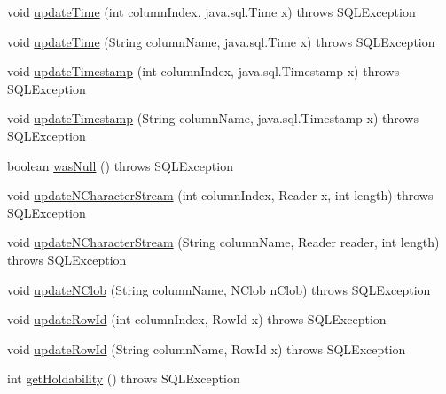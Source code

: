 \begin{DoxyCompactItemize}
\item 
void \mbox{\hyperlink{classcom_1_1mysql_1_1cj_1_1jdbc_1_1result_1_1_result_set_impl_afe7d6a52596562d5b96b53e8bc40d262}{update\+Time}} (int column\+Index, java.\+sql.\+Time x)  throws S\+Q\+L\+Exception 
\item 
void \mbox{\hyperlink{classcom_1_1mysql_1_1cj_1_1jdbc_1_1result_1_1_result_set_impl_a7de415573417c0773b21eab859ce5018}{update\+Time}} (String column\+Name, java.\+sql.\+Time x)  throws S\+Q\+L\+Exception 
\item 
void \mbox{\hyperlink{classcom_1_1mysql_1_1cj_1_1jdbc_1_1result_1_1_result_set_impl_afa5a174ab3e6d4b9e103d6d826c15c75}{update\+Timestamp}} (int column\+Index, java.\+sql.\+Timestamp x)  throws S\+Q\+L\+Exception 
\item 
void \mbox{\hyperlink{classcom_1_1mysql_1_1cj_1_1jdbc_1_1result_1_1_result_set_impl_ac86c897d9f1641b3985981ad38f0230d}{update\+Timestamp}} (String column\+Name, java.\+sql.\+Timestamp x)  throws S\+Q\+L\+Exception 
\item 
boolean \mbox{\hyperlink{classcom_1_1mysql_1_1cj_1_1jdbc_1_1result_1_1_result_set_impl_ab1ba92f109b4c15cb3de8ed30b193ff2}{was\+Null}} ()  throws S\+Q\+L\+Exception 
\item 
void \mbox{\hyperlink{classcom_1_1mysql_1_1cj_1_1jdbc_1_1result_1_1_result_set_impl_a3326425b4127583b88d1d7806166b9af}{update\+N\+Character\+Stream}} (int column\+Index, Reader x, int length)  throws S\+Q\+L\+Exception 
\item 
void \mbox{\hyperlink{classcom_1_1mysql_1_1cj_1_1jdbc_1_1result_1_1_result_set_impl_a6a0e707bf6f2fa3fde9c3b3d1d23733b}{update\+N\+Character\+Stream}} (String column\+Name, Reader reader, int length)  throws S\+Q\+L\+Exception 
\item 
void \mbox{\hyperlink{classcom_1_1mysql_1_1cj_1_1jdbc_1_1result_1_1_result_set_impl_ac90a37ec81374f3cb07902d345aa38cf}{update\+N\+Clob}} (String column\+Name, N\+Clob n\+Clob)  throws S\+Q\+L\+Exception 
\item 
void \mbox{\hyperlink{classcom_1_1mysql_1_1cj_1_1jdbc_1_1result_1_1_result_set_impl_a8c91a6572ee12df2c1b8229af9c48fe4}{update\+Row\+Id}} (int column\+Index, Row\+Id x)  throws S\+Q\+L\+Exception 
\item 
void \mbox{\hyperlink{classcom_1_1mysql_1_1cj_1_1jdbc_1_1result_1_1_result_set_impl_a76cab05cbda780cf5f0a57325637b31a}{update\+Row\+Id}} (String column\+Name, Row\+Id x)  throws S\+Q\+L\+Exception 
\item 
int \mbox{\hyperlink{classcom_1_1mysql_1_1cj_1_1jdbc_1_1result_1_1_result_set_impl_acc4ad21ac9b1ac5dffb380f6a2dbdcb7}{get\+Holdability}} ()  throws S\+Q\+L\+Exception 

\end{DoxyCompactItemize}
